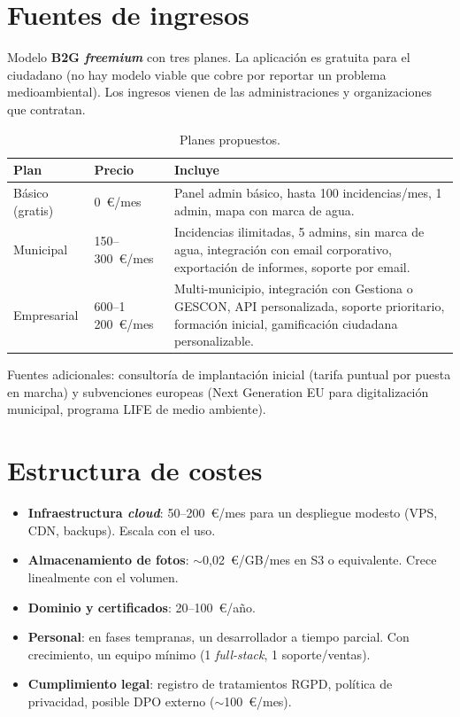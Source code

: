 \section*{Fuentes de ingresos}

Modelo \textbf{B2G \textit{freemium}} con tres planes. La aplicación es gratuita para el ciudadano (no hay modelo viable que cobre por reportar un problema medioambiental). Los ingresos vienen de las administraciones y organizaciones que contratan.

\begin{table}[H]
\centering
\caption{Planes propuestos.}
\label{tab:planes}
\small
\begin{tabular}{@{}L{2.5cm}L{3cm}L{7.5cm}@{}}
\toprule
\textbf{Plan} & \textbf{Precio} & \textbf{Incluye} \\
\midrule
Básico (gratis) & 0~€/mes & Panel admin básico, hasta 100 incidencias/mes, 1 admin, mapa con marca de agua. \\
Municipal & 150--300~€/mes & Incidencias ilimitadas, 5 admins, sin marca de agua, integración con email corporativo, exportación de informes, soporte por email. \\
Empresarial & 600--1\,200~€/mes & Multi-municipio, integración con Gestiona o GESCON, API personalizada, soporte prioritario, formación inicial, gamificación ciudadana personalizable. \\
\bottomrule
\end{tabular}
\end{table}

Fuentes adicionales: consultoría de implantación inicial (tarifa puntual por puesta en marcha) y subvenciones europeas (Next Generation EU para digitalización municipal, programa LIFE de medio ambiente).


\section*{Estructura de costes}

\begin{itemize}
  \item \textbf{Infraestructura \textit{cloud}}: 50--200~€/mes para un despliegue modesto (VPS, CDN, backups). Escala con el uso.
  \item \textbf{Almacenamiento de fotos}: $\sim$0,02~€/GB/mes en S3 o equivalente. Crece linealmente con el volumen.
  \item \textbf{Dominio y certificados}: 20--100~€/año.
  \item \textbf{Personal}: en fases tempranas, un desarrollador a tiempo parcial. Con crecimiento, un equipo mínimo (1 \textit{full-stack}, 1 soporte/ventas).
  \item \textbf{Cumplimiento legal}: registro de tratamientos RGPD, política de privacidad, posible DPO externo ($\sim$100~€/mes).
\end{itemize}


